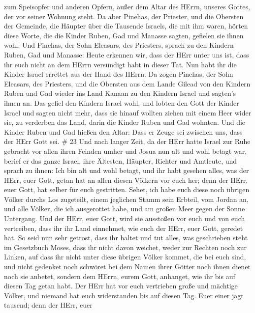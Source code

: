 zum Speisopfer und anderen Opfern, außer dem Altar des HErrn, unseres
Gottes, der vor seiner Wohnung steht.  Da aber Pinehas, der
Priester, und die Obersten der Gemeinde, die Häupter über die Tausende
Israels, die mit ihm waren, hörten diese Worte, die die Kinder Ruben,
Gad und Manasse sagten, gefielen sie ihnen wohl.  Und
Pinehas, der Sohn Eleasars, des Priesters, sprach zu den Kindern Ruben,
Gad und Manasse: Heute erkennen wir, dass der HErr unter uns ist, dass
ihr euch nicht an dem HErrn versündigt habt in dieser Tat. Nun habt ihr
die Kinder Israel errettet aus der Hand des HErrn.  Da
zogen Pinehas, der Sohn Eleasars, des Priesters, und die Obersten aus
dem Lande Gilead von den Kindern Ruben und Gad wieder ins Land Kanaan zu
den Kindern Israel und sagten's ihnen an.  Das gefiel den
Kindern Israel wohl, und lobten den Gott der Kinder Israel und sagten
nicht mehr, dass sie hinauf wollten ziehen mit einem Heer wider sie, zu
verderben das Land, darin die Kinder Ruben und Gad wohnten.
 Und die Kinder Ruben und Gad hießen den Altar: Dass er
Zeuge sei zwischen uns, dass der HErr Gott sei. \# 23  Und
nach langer Zeit, da der HErr hatte Israel zur Ruhe gebracht vor allen
ihren Feinden umher und Josua nun alt und wohl betagt war, 
berief er das ganze Israel, ihre Ältesten, Häupter, Richter und
Amtleute, und sprach zu ihnen: Ich bin alt und wohl betagt, 
und ihr habt gesehen alles, was der HErr, euer Gott, getan hat an allen
diesen Völkern vor euch her; denn der HErr, euer Gott, hat selber für
euch gestritten.  Sehet, ich habe euch diese noch übrigen
Völker durchs Los zugeteilt, einem jeglichen Stamm sein Erbteil, vom
Jordan an, und alle Völker, die ich ausgerottet habe, und am großen Meer
gegen der Sonne Untergang.  Und der HErr, euer Gott, wird
sie ausstoßen vor euch und von euch vertreiben, dass ihr ihr Land
einnehmet, wie euch der HErr, euer Gott, geredet hat.  So
seid nun sehr getrost, dass ihr haltet und tut alles, was geschrieben
steht im Gesetzbuch Moses, dass ihr nicht davon weichet, weder zur
Rechten noch zur Linken,  auf dass ihr nicht unter diese
übrigen Völker kommet, die bei euch sind, und nicht gedenket noch
schwöret bei dem Namen ihrer Götter noch ihnen dienet noch sie anbetet,
 sondern dem HErrn, eurem Gott, anhanget, wie ihr bis auf
diesen Tag getan habt.  Der HErr hat vor euch vertrieben
große und mächtige Völker, und niemand hat euch widerstanden bis auf
diesen Tag.  Euer einer jagt tausend; denn der HErr, euer
